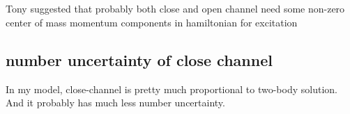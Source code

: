 \subsection{}
Tony suggested that probably both close and open channel need some non-zero center of mass momentum components in hamiltonian for excitation

\subsection{number uncertainty of close channel}
In my model, close-channel is pretty much proportional to two-body solution.  And it probably has much less number uncertainty.  